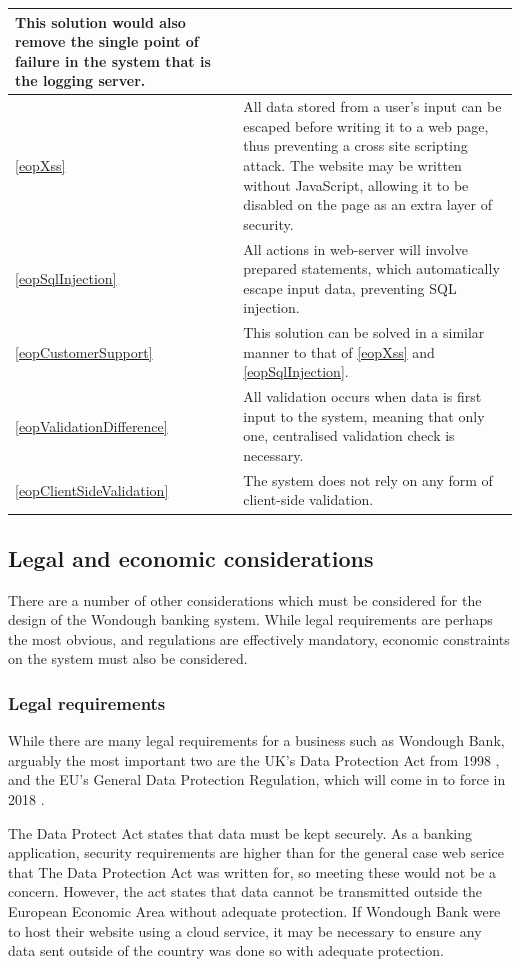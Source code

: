 \begin{longtable}{|| p{} | p{} ||}
        This solution would also remove the single point of failure in the system that is the logging server.
    \\ \hline \ref{eopXss} &
        All data stored from a user's input can be escaped before writing it to a web page, thus preventing a cross site scripting attack. The website may be written without JavaScript, allowing it to be disabled on the page as an extra layer of security.
    \\ \hline \ref{eopSqlInjection} &
        All actions in web-server will involve prepared statements, which automatically escape input data, preventing SQL injection.
    \\ \hline \ref{eopCustomerSupport} &
        This solution can be solved in a similar manner to that of \ref{eopXss} and \ref{eopSqlInjection}.
    \\ \hline \ref{eopValidationDifference} & 
        All validation occurs when data is first input to the system, meaning that only one, centralised validation check is necessary.
    \\ \hline \ref{eopClientSideValidation} &
        The system does not rely on any form of client-side validation.
    \\ \hline

\end{longtable}

\subsection{Legal and economic considerations}

There are a number of other considerations which must be considered for the design of the Wondough banking system. While legal requirements are perhaps the most obvious, and regulations are effectively mandatory, economic constraints on the system must also be considered.

\subsubsection{Legal requirements}

While there are many legal requirements for a business such as Wondough Bank, arguably the most important two are the UK's Data Protection Act from 1998 \cite{dataProtectionAct}, and the EU's General Data Protection Regulation, which will come in to force in 2018 \cite{generalDataProtectionRegulation}. 

The Data Protect Act states that data must be kept securely. As a banking application, security requirements are higher than for the general case web serice that The Data Protection Act was written for, so meeting these would not be a concern. However, the act states that data cannot be transmitted outside the European Economic Area without adequate protection. If Wondough Bank were to host their website using a cloud service, it may be necessary to ensure any data sent outside of the country was done so with adequate protection.


